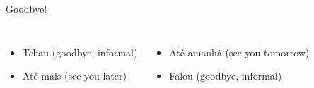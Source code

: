 \begin{frame}{Goodbye!}
  \begin{columns}
    \begin{itemize}
    \item<1-> Tchau (goodbye, informal)
    \item<2-> At\'e mais (see you later)
    \end{itemize}
    \begin{itemize}
    \item<3-> At\'e amanh\~a (see you tomorrow)
    \item<4-> Falou (goodbye, informal)
    \end{itemize}
  \end{columns}
\end{frame}
